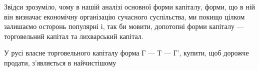 Звідси зрозуміло, чому в нашій аналізі основної форми капіталу,
форми, що в ній він визначає економічну організацію сучасного
суспільства, ми покищо цілком залишаємо осторонь популярні
і, так би мовити, допотопні форми капіталу — торговельний
капітал та лихварський капітал.

У русі власне торговельного капіталу форма Г — Т — Г',
купити, щоб дорожче продати, з’являється в найчистішому
\parbreak{}  %
